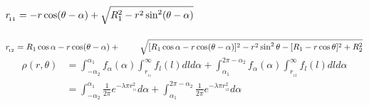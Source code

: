 \documentclass{report}
\begin{document}
$
r_{\!_{11}} = -r\cos(\theta -\alpha) + \sqrt{\strut R_1^2 - r^2\sin^2(\theta - \alpha)}
$
\\
\\
$
r_{\!_{12}} = R_1 \cos \alpha - r\cos(\theta - \alpha)  + \\ ~ \qquad \sqrt{\strut [R_1 \cos \alpha - r\cos(\theta-\alpha) ]^2 - r^2\sin^2 \theta - [R_1 - r\cos \theta]^2 + R_2^2}
$
\\
\begin{align*}
\rho(r,\theta) &=  \int_{-\alpha_2}^{\alpha_1} f_{\alpha}(\alpha) \int_{r_{\!_{11}}}^{\infty} f_l(l)dl d\alpha +  \int^{2\pi-\alpha_2}_{\alpha_1} f_{\alpha}(\alpha) \int_{r_{\!_{12}}}^{\infty} f_l(l)dl d\alpha  \\
&=\int_{-\alpha_2}^{\alpha_1} \frac{1}{2\pi} e^{-\lambda \pi r_{\!_{11}}^2} d\alpha +  \int^{2\pi-\alpha_2}_{\alpha_1} \frac{1}{2\pi} e^{-\lambda \pi r_{\!_{12}}^2} d\alpha
\end{align*}
\end{document}

